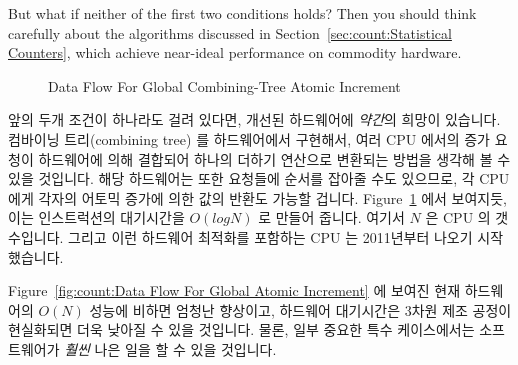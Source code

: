 \begin{enumerate}
	But what if neither of the first two conditions holds?
	Then you should think carefully about the algorithms discussed
	in Section~\ref{sec:count:Statistical Counters}, which achieve
	near-ideal performance on commodity hardware.
	\fi

\begin{figure}[tb]
\begin{center}
\end{center}
\caption{Data Flow For Global Combining-Tree Atomic Increment}
\label{fig:count:Data Flow For Global Combining-Tree Atomic Increment}
\end{figure}

	앞의 두개 조건이 하나라도 걸려 있다면, 개선된 하드웨어에 \emph{약간}의
	희망이 있습니다.
	컴바이닝 트리(combining tree) 를 하드웨어에서 구현해서, 여러 CPU 에서의
	증가 요청이 하드웨어에 의해 결합되어 하나의 더하기 연산으로 변환되는
	방법을 생각해 볼 수 있을 것입니다.
	해당 하드웨어는 또한 요청들에 순서를 잡아줄 수도 있으므로, 각 CPU 에게
	각자의 어토믹 증가에 의한 값의 반환도 가능할 겁니다.
	Figure~\ref{fig:count:Data Flow For Global Combining-Tree Atomic Increment}
	에서 보여지듯, 이는 인스트럭션의 대기시간을 $O(log N)$ 로 만들어
	줍니다. 여기서 $N$ 은 CPU 의 갯수입니다.
	그리고 이런 하드웨어 최적화를 포함하는 CPU 는 2011년부터 나오기
	시작했습니다.

	Figure~\ref{fig:count:Data Flow For Global Atomic Increment} 에 보여진
	현재 하드웨어의  $O(N)$ 성능에 비하면 엄청난 향상이고, 하드웨어
	대기시간은 3차원 제조 공정이 현실화되면 더욱 낮아질 수 있을 것입니다.
	물론, 일부 중요한 특수 케이스에서는 소프트웨어가 \emph{훨씬} 나은 일을
	할 수 있을 것입니다.

\end{enumerate}
